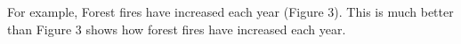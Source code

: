 \documentclass{tufte-handout}\usepackage[]{graphicx}\usepackage[]{color}
\begin{document}
For example, Forest fires have increased each year (Figure 3). 
This is much better than Figure 3 shows how forest fires have increased each year. 








\end{document}
